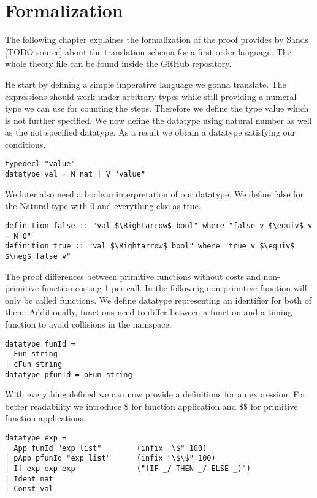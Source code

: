 
\chapter{Formalization}\label{chapter:formal}

The following chapter explaines the formalization of the proof provides by Sands [TODO source] about the translation schema for a first-order language.
The whole theory file can be found inside the GitHub repository.

He start by defining a simple imperative language we gonna translate.
The expressions should work under arbitrary types while still providing a numeral type we can use for counting the steps.
Therefore we define the type value which is not further specified.
We now define the datatype using natural number as well as the not specified datatype.
As a result we obtain a datatype satisfying our conditions.
\begin{lstlisting}[]
typedecl "value"
datatype val = N nat | V "value"
\end{lstlisting}

We later also need a boolean interpretation of our datatype.
We define false for the Natural type with 0 and everything else as true.
\begin{lstlisting}[mathescape=true]
definition false :: "val $\Rightarrow$ bool" where "false v $\equiv$ v = N 0"
definition true :: "val $\Rightarrow$ bool" where "true v $\equiv$ $\neg$ false v"
\end{lstlisting}

The proof differences between primitive functions without costs and non-primitive function costing 1 per call.
In the follownig non-primitive function will only be called functions.
We define datatype representing an identifier for both of them.
Additionally, functions need to differ between a function and a timing function to avoid collisions in the namspace.

\begin{lstlisting}
datatype funId =
  Fun string
| cFun string
datatype pfunId = pFun string
\end{lstlisting}

With everything defined we can now provide a definitions for an expression.
For better readability we introduce \$ for function application and \$\$ for primitive function applications.
\begin{lstlisting}
datatype exp =
  App funId "exp list"        (infix "\$" 100)
| pApp pfunId "exp list"      (infix "\$\$" 100)
| If exp exp exp              ("(IF _/ THEN _/ ELSE _)")
| Ident nat
| Const val
\end{lstlisting}

